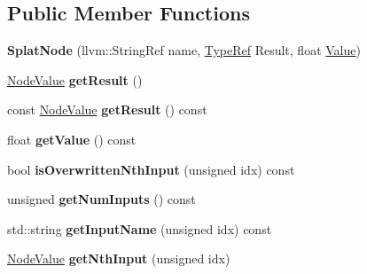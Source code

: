 \subsection*{Public Member Functions}
\begin{DoxyCompactItemize}
\item 
\mbox{\label{classglow_1_1_splat_node_a3687df66c1f5243fdf66bd89f35ea6d5}} 
{\bfseries Splat\+Node} (llvm\+::\+String\+Ref name, \hyperlink{structglow_1_1_type}{Type\+Ref} Result, float \hyperlink{classglow_1_1_value}{Value})
\item 
\mbox{\label{classglow_1_1_splat_node_ade421ccf3914b8eea8fd4232eedc30ed}} 
\hyperlink{structglow_1_1_node_value}{Node\+Value} {\bfseries get\+Result} ()
\item 
\mbox{\label{classglow_1_1_splat_node_a38fe4a44fbdb98f1f61a67f0e71b1349}} 
const \hyperlink{structglow_1_1_node_value}{Node\+Value} {\bfseries get\+Result} () const
\item 
\mbox{\label{classglow_1_1_splat_node_a83a818b13fd7a4943ec2e8e534487a8a}} 
float {\bfseries get\+Value} () const
\item 
\mbox{\label{classglow_1_1_splat_node_ad0896ab802bd75b5e5e81ce6d8215c96}} 
bool {\bfseries is\+Overwritten\+Nth\+Input} (unsigned idx) const
\item 
\mbox{\label{classglow_1_1_splat_node_aa35ab41b283f402290de47fce2e9b727}} 
unsigned {\bfseries get\+Num\+Inputs} () const
\item 
\mbox{\label{classglow_1_1_splat_node_a4e96d8978bd8421a1da089803a1088fd}} 
std\+::string {\bfseries get\+Input\+Name} (unsigned idx) const
\item 
\mbox{\label{classglow_1_1_splat_node_a92bd53fd185c0f9d2ee474df5d4bfd8e}} 
\hyperlink{structglow_1_1_node_value}{Node\+Value} {\bfseries get\+Nth\+Input} (unsigned idx)
\item 
\mbox{\label{classglow_1_1_splat_node_ad30dfc903d54e60ce1e7b1d2cdc0fb07}} 

\end{DoxyCompactItemize}
